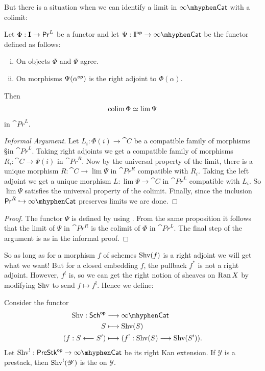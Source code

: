 \documentclass[oneside]{amsart}
\newcommand{\PreStk}{\cat{PreStk}}
\newcommand{\CY}{\mathcal{Y}}
\newcommand{\PrL}{\cat{Pr}^L}
\newcommand{\PrR}{\cat{Pr}^R}
\begin{document}
But there is a situation when we can identify a limit in $\iCat$ with a colimit:
\begin{proposition}\label{prop:lim-colim}
	Let $\Phi:\bb{I}\to \PrL$ be a functor and let $\Psi:\bb{I}\op\to \iCat$ be the functor defined as follows:
	\begin{enumerate}[(i)]
		\item On objects $\Phi$ and $\Psi$ agree.
		\item On morphisms $\Psi(\alpha^\mathsf{op})$ is the right adjoint to $\Phi(\alpha)$.
	\end{enumerate}
	Then
	\[
	\operatorname*{colim} \Phi \simeq \lim \Psi
	\] 
	in $\PrL$.
\end{proposition}
\begin{proof}[Informal Argument]
	Let $L_i:\Phi(i)\to \cat{C}$ be a compatible family of morphisms §in $\PrL$. Taking right adjoints we get a compatible family of morphisms $R_i:\cat{C}\to \Psi(i)$ in $\PrR$. Now by the universal property of the limit, there is a unique morphism $R:\cat{C}\to \lim \Psi$ in $\PrR$ compatible with $R_i$. Taking the left adjoint we get a unique morphism $L:\lim \Psi\to \cat{C}$ in $\PrL$ compatible with $L_i$. So $\lim \Psi$ satisfies the universal property of the colimit. Finally, since the inclusion $\PrR\injto\iCat$ \cite[Proposition~5.5.3.18]{htt} preserves limits we are done.
\end{proof}
\begin{proof}[Proof]
	The functor $\Psi$ is defined by using \cite[Proposition~5.5.3.4]{htt}. From the same proposition it follows that the limit of $\Psi$ in $\PrR$ is the colimit of $\Phi$ in $\PrL$. The final step of the argument is as in the informal proof.
\end{proof}

So as long as for a morphism $f$ of schemes $\operatorname{Shv}(f)$ is a right adjoint we will get what we want! But for a closed embedding $f$, the pullback $f^{*}$ is not a right adjoint. However, $f^{!}$ is, so we can get the right notion of sheaves on $\operatorname{Ran} X$ by modifying $\operatorname{Shv}$ to send $f\mapsto f^{!}$. Hence we define:
\begin{definition}
	Consider the functor
	\begin{align*}
		\Shv: \Sch\op &\longrightarrow \iCat \\
		S &\longmapsto \Shv(S) \\
		(f:S\from S') &\longmapsto (f^{!}:\Shv(S)\to \Shv(S')).
	\end{align*}
	Let $\Shv^{!}:\PreStk\op\to \iCat$ be its right Kan extension. If $\CY$ is a prestack, then $\Shv^{!}(\CY)$ is the  on $\CY$.
\end{definition}
\end{document}
